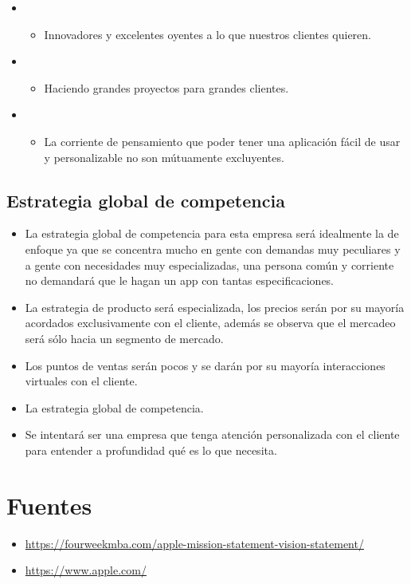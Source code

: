\documentclass{article}
\begin{document}
\begin{itemize}
\begin{itemize}
            \item {} 
                \begin{itemize}
                    \item Innovadores y excelentes oyentes a lo que nuestros clientes quieren.
                \end{itemize}
                
            \item {} 
                \begin{itemize}
                    \item Haciendo grandes proyectos para grandes clientes.
                \end{itemize}
                
            \item {} 
                \begin{itemize}
                    \item La corriente de pensamiento que poder tener una aplicación fácil de usar y personalizable no son mútuamente excluyentes.
                \end{itemize}
        \end{itemize}
\end{itemize}


\subsection{Estrategia global de competencia}
\begin{itemize}
    \item La estrategia global de competencia para esta empresa será idealmente la de enfoque ya que se concentra mucho en gente con demandas muy peculiares y a gente con necesidades muy especializadas, una persona común y corriente no demandará que le hagan un app con tantas especificaciones.
    \item La estrategia de producto será especializada, los precios serán por su mayoría acordados exclusivamente con el cliente, además se observa que el mercadeo será sólo hacia un segmento de mercado. 
    \item Los puntos de ventas serán pocos y se darán por su mayoría interacciones virtuales con el cliente.
    \item La estrategia global de competencia.
    \item Se intentará ser una empresa que tenga atención personalizada con el cliente para entender a profundidad qué es lo que necesita.
\end{itemize}




\section{Fuentes}
\begin{itemize}
    \item \url{https://fourweekmba.com/apple-mission-statement-vision-statement/}
    \item \url{https://www.apple.com/}
\end{itemize}
\end{document}
